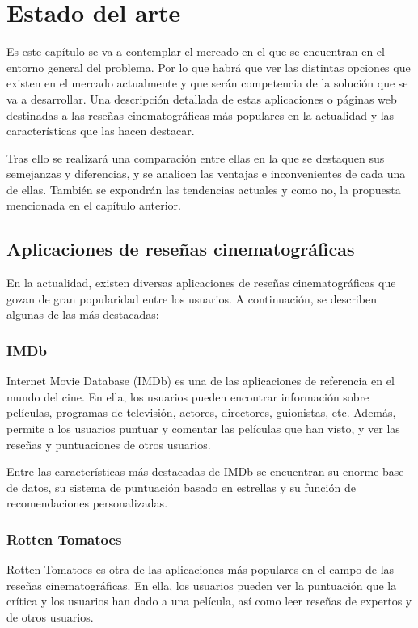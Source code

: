 \chapter{Estado del arte}

Es este capítulo se va a contemplar el mercado en el que se encuentran en el entorno general del 
problema. Por lo que habrá que ver las distintas opciones que existen en el 
mercado actualmente y que serán competencia de la solución que se va a desarrollar. Una descripción 
detallada de estas aplicaciones o páginas web destinadas a las reseñas cinematográficas más populares 
en la actualidad y las características que las hacen destacar.

Tras ello se realizará una comparación entre ellas en la que se destaquen sus semejanzas y 
diferencias, y se analicen las ventajas e inconvenientes de cada una de ellas. También se expondrán 
las tendencias actuales y como no, la propuesta mencionada en el capítulo anterior.

\section{Aplicaciones de reseñas cinematográficas}

En la actualidad, existen diversas aplicaciones de reseñas cinematográficas que gozan de gran 
popularidad entre los usuarios. A continuación, se describen algunas de las más destacadas:

\subsection{IMDb}

Internet Movie Database (IMDb) es una de las aplicaciones de referencia en el mundo del cine. En ella, 
los usuarios pueden encontrar información sobre películas, programas de televisión, actores, 
directores, guionistas, etc. Además, permite a los usuarios puntuar y comentar las películas que han 
visto, y ver las reseñas y puntuaciones de otros usuarios.

Entre las características más destacadas de IMDb se encuentran su enorme base de datos, su sistema de 
puntuación basado en estrellas y su función de recomendaciones personalizadas.

\subsection{Rotten Tomatoes}

Rotten Tomatoes es otra de las aplicaciones más populares en el campo de las reseñas cinematográficas. 
En ella, los usuarios pueden ver la puntuación que la crítica y los usuarios han dado a una película, 
así como leer reseñas de expertos y de otros usuarios.

